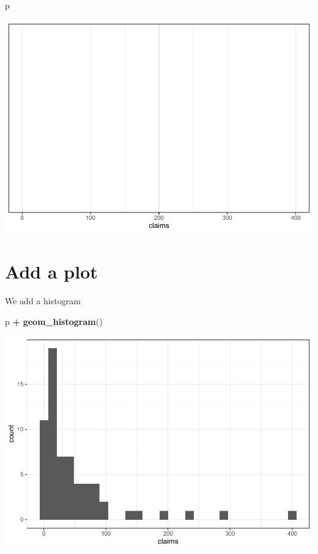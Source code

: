 \documentclass[
  openany]{book}
\newenvironment{Shaded}{\begin{snugshade}}{\end{snugshade}}
\newcommand{\KeywordTok}[1]{\textcolor[rgb]{0.13,0.29,0.53}{\textbf{#1}}}
\newcommand{\NormalTok}[1]{#1}
\newcommand{\OperatorTok}[1]{\textcolor[rgb]{0.81,0.36,0.00}{\textbf{#1}}}
\newcommand{\StringTok}[1]{\textcolor[rgb]{0.31,0.60,0.02}{#1}}
\begin{document}
\begin{Shaded}
\begin{Highlighting}[]
\NormalTok{p}
\end{Highlighting}
\end{Shaded}

\includegraphics{04-visualization_files/figure-latex/unnamed-chunk-3-1.pdf}

\hypertarget{add-a-plot}{%
\section{Add a plot}\label{add-a-plot}}

We add a histogram

\begin{Shaded}
\begin{Highlighting}[]
\NormalTok{p }\OperatorTok{+}\StringTok{ }\KeywordTok{geom_histogram}\NormalTok{()}
\end{Highlighting}
\end{Shaded}

\includegraphics{04-visualization_files/figure-latex/unnamed-chunk-4-1.pdf}
\end{document}
